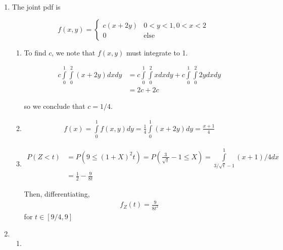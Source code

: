 \documentclass[12pt]{article}
\begin{document}
\begin{enumerate}
\item The joint pdf is

$$f(x,y) = \begin{cases} 
c(x + 2y) & 0 < y < 1, 0 < x < 2 \\
0 & \text{else}
\end{cases}$$

\begin{enumerate}

\item To find $c$, we note that $f(x,y)$ must integrate to 1.

\begin{align*}
c \int \limits_0^1 \int \limits_0^2 (x + 2y) dx dy &= c \int \limits_0^1 \int \limits_0^2 x dx dy + c \int \limits_0^1 \int \limits_0^2 2y dx dy \\
&= 2c + 2c
\end{align*}

so we conclude that $c= 1/4$.

\item 

\begin{align*}
f(x) = \int \limits_0^1 f(x,y) dy = \frac{1}{4} \int \limits_0^1 (x + 2y) dy = \frac{x + 1}{4}
\end{align*}

\item 

\begin{align*}
P(Z < t) &= P(9 \leq (1 + X)^2t) = P(\frac{3}{\sqrt{t}} - 1 \leq X) = \int \limits_{3/\sqrt{t} - 1}^1 (x + 1)/4 dx \\
&= \frac{1}{2} - \frac{9}{8t}
\end{align*}

Then, differentiating,
\begin{align*}
f_Z(t) = \frac{9}{8 t^2}
\end{align*}
for $t \in [9/4, 9]$

\end{enumerate}

\item 

\begin{enumerate}
\item


\end{enumerate}
\end{enumerate}
\end{document}
